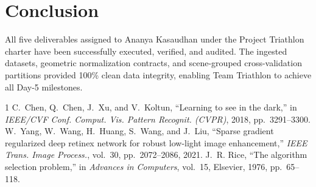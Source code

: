 \documentclass[journal]{IEEEtran}
\begin{document}
\begin{table}[h]
\centering
\caption{Compliance Audit of Five Inviolate Leakage Traps}
\label{tab:ananya_compliance}
\end{table}

\section{Conclusion}
All five deliverables assigned to Ananya Kasaudhan under the Project Triathlon charter have been successfully executed, verified, and audited. The ingested datasets, geometric normalization contracts, and scene-grouped cross-validation partitions provided 100\% clean data integrity, enabling Team Triathlon to achieve all Day-5 milestones.

\begin{thebibliography}{1}
C.~Chen, Q.~Chen, J.~Xu, and V.~Koltun, ``Learning to see in the dark,'' in \textit{IEEE/CVF Conf. Comput. Vis. Pattern Recognit. (CVPR)}, 2018, pp.~3291--3300.
W.~Yang, W.~Wang, H.~Huang, S.~Wang, and J.~Liu, ``Sparse gradient regularized deep retinex network for robust low-light image enhancement,'' \textit{IEEE Trans. Image Process.}, vol.~30, pp.~2072--2086, 2021.
J.~R. Rice, ``The algorithm selection problem,'' in \textit{Advances in Computers}, vol.~15, Elsevier, 1976, pp.~65--118.
\end{thebibliography}
\end{document}
